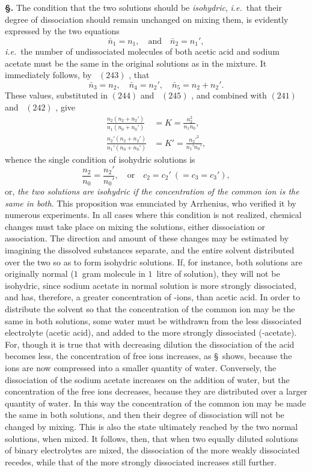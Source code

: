 \documentclass[12pt]{book}[2005/09/16]
\newcommand{\Typo}[2]{#2}
\newcommand{\Section}[1]{
  \medskip\par\textbf{§\;#1}
  \label{section:#1}
}
\newcommand{\SecRef}[2][§\;]{\hyperref[section:#2.]{{\upshape #1#2}}}
\newcommand{\Eq}[1]{%
  \hyperref[eqn:#1]{\ensuremath{#1}}%
}
\newcommand{\PageSep}[1]{\ignorespaces}
\newcommand{\ie}{\emph{i.e.}}
\begin{document}
\Section{276.} The condition that the two solutions should be
%
\emph{isohydric}, \ie\ that their degree of dissociation should remain
unchanged on mixing them, is evidently expressed by the
two equations
\[
\bar{n}_{1} = n_{1},\quad\text{and}\quad
\bar{n}_{2} = n_{1}',
\]
\ie\ the number of undissociated molecules of both acetic
acid and sodium acetate must be the same in the original
solutions as in the mixture. It immediately follows, by~\Eq{(243)},
that
\[
\bar{n}_{3} = n_{2},\quad
\bar{n}_{4} = n_{2}',\quad
\bar{n}_{5} = n_{2} + n_{2}'.
\]
These values, substituted in \Eq{(244)} and~\Eq{(245)}, and combined
with \Eq{(241)} and~\Eq{(242)}, give
\begin{align*}
\frac{n_{2} (n_{2} + n_{2}')}{n_{1} (n_{0} + n_{0}')}
  &= K = \frac{n_{2}^{2}}{n_{1} n_{0}}, \\
\frac{n_{2}' (n_{2} + n_{2}')}{n_{1}' (n_{0} + n_{0}')}
  &= K' = \frac{n_{2}'^{2}}{n_{1}' n_{0}'},
\end{align*}
whence the single condition of isohydric solutions is
%
\[
\frac{n_{2}}{n_{0}} = \frac{n_{2}'}{n_{0}'},\quad\text{or}\quad
c_{2} = c_{2}'\ (= c_{3} = c_{3}'),
\]
or, \emph{the two solutions are isohydric if the concentration of
the common ion \emph{} is the same in both}. This proposition
was enunciated by Arrhenius, who verified it by
%
numerous experiments. In all cases where this condition
is not realized, chemical changes must take place on mixing
the solutions, either dissociation or association. The direction
and amount of these changes may be estimated by imagining
the dissolved substances separate, and the entire solvent
distributed over the two so as to form isohydric solutions.
\PageSep{259}
If, for instance, both solutions are originally normal ($1$~gram
molecule in $1$~litre of solution), they will not be isohydric,
since sodium acetate in normal solution is more strongly
dissociated, and has, therefore, a greater concentration of
-ions, than acetic acid. In order to distribute the
solvent so that the concentration of the common ion
 may be the same in both solutions, some water
must be withdrawn from the less dissociated electrolyte
(acetic acid), and added to the more strongly dissociated
(-acetate). For, though it is true that with decreasing
dilution the dissociation of the acid becomes less, the concentration
of free ions increases, as \Typo{(262)}{\SecRef{262}}~shows, because the
ions are now compressed into a smaller quantity of water.
Conversely, the dissociation of the sodium acetate increases
on the addition of water, but the concentration of the free
ions decreases, because they are distributed over a larger
quantity of water. In this way the concentration of the
common ion  may be made the same in both
solutions, and then their degree of dissociation will not be
changed by mixing. This is also the state ultimately
reached by the two normal solutions, when mixed. It
follows, then, that when two equally diluted solutions of
binary electrolytes are mixed, the dissociation of the more
weakly dissociated recedes, while that of the more strongly
dissociated increases still further.
\end{document}
